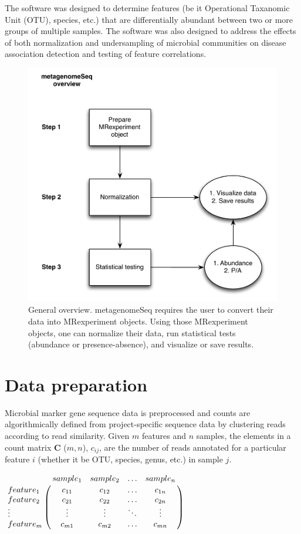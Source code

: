 \documentclass[a4paper,11pt]{article}\usepackage[]{graphicx}\usepackage[]{color}
\begin{document}
The software was designed to determine features (be it Operational Taxanomic Unit (OTU), species, etc.) that are differentially abundant between two or more groups of multiple samples. 
The software was also designed to address the effects of both normalization and undersampling of microbial communities on disease association detection and testing of feature correlations.

\begin{figure}
\centerline{\includegraphics[width=.55\textwidth]{overview.pdf}}
\caption{General overview. metagenomeSeq requires the user to convert their data into MRexperiment objects. Using those MRexperiment objects, one can normalize their data, run statistical tests (abundance or presence-absence), and visualize or save results.}
\end{figure}

\newpage
\section{Data preparation}
Microbial marker gene sequence data is preprocessed and counts are algorithmically defined 
from project-specific sequence data by clustering reads according to read similarity. 
Given $m$ features and $n$ samples, the elements in a count matrix 
\textbf{C} ($m, n$), $c_{ij}$, are the number of reads annotated for a particular 
feature $i$ (whether it be OTU, species, genus, etc.) in sample $j$. \\


\begin{center}
$\bordermatrix{ &sample_1&sample_2&\ldots &sample_n\cr feature_1&c_{11} &  c_{12}  & \ldots & c_{1n}\cr feature_2& c_{21}  &  c_{22} & \ldots & c_{2n}\cr \vdots & \vdots & \vdots & \ddots & \vdots\cr feature_m & c_{m1}  &   c_{m2} &\ldots & c_{mn}}$
\end{center}
\end{document}
